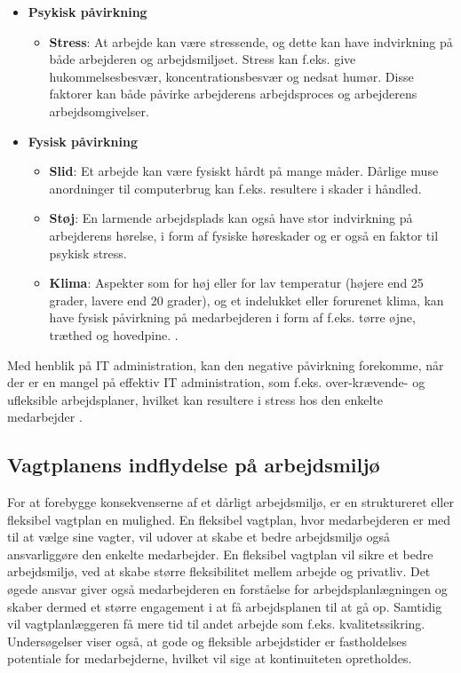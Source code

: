 \begin{itemize}
    \item {\textbf{Psykisk påvirkning} \citep{Arbejdsmiljoe_psykisk}}
    \begin{itemize}
    \item {\textbf{Stress}: At arbejde kan være stressende, og dette kan have indvirkning på både arbejderen og arbejdsmiljøet. Stress kan f.eks. give hukommelsesbesvær, koncentrationsbesvær og nedsat humør. Disse faktorer kan både påvirke arbejderens arbejdsproces og arbejderens arbejdsomgivelser. \citep{Arbejdsmiljoe_stress}}\\
    \end{itemize}
    \item {\textbf{Fysisk påvirkning} \citep{Arbejdsmiljoe_fysisk}}
    \begin{itemize}
    \item {\textbf{Slid}: Et arbejde kan være fysiskt hårdt på mange måder. Dårlige muse anordninger til computerbrug kan f.eks. resultere i skader i håndled. \citep{Arbejdsmiljoe_fysisk}}
    \item {\textbf{Støj}: En larmende arbejdsplads kan også have stor indvirkning på arbejderens hørelse, i form af fysiske høreskader og er også en faktor til psykisk stress. \citep{Arbejdsmiljoe_stoej}}
    \item {\textbf{Klima}: Aspekter som for høj eller for lav temperatur (højere end 25 grader, lavere end 20 grader), og et indelukket eller forurenet klima, kan have fysisk påvirkning på medarbejderen i form af f.eks. tørre øjne, træthed og hovedpine. \citep{Arbejdsmiljoe_indeklima}.}\\
    \end{itemize}
\end{itemize}

Med henblik på IT administration, kan den negative påvirkning forekomme, når der er en mangel på effektiv IT administration, som f.eks. over-krævende- og ufleksible arbejdsplaner, hvilket kan resultere i stress hos den enkelte medarbejder \citep{Cambridge2011}.

\subsection{Vagtplanens indflydelse på arbejdsmiljø}
For at forebygge konsekvenserne af et dårligt arbejdsmiljø, er en struktureret eller fleksibel vagtplan en mulighed. En fleksibel vagtplan, hvor medarbejderen er med til at vælge sine vagter, vil udover at skabe et bedre arbejdsmiljø også ansvarliggøre den enkelte medarbejder. En fleksibel vagtplan vil sikre et bedre arbejdsmiljø, ved at skabe større fleksibilitet mellem arbejde og privatliv. Det øgede ansvar giver også medarbejderen en forståelse for arbejdsplanlægningen og skaber dermed et større engagement i at få arbejdsplanen til at gå op. Samtidig vil vagtplanlæggeren få mere tid til andet arbejde som f.eks. kvalitetssikring.
Undersøgelser viser også, at gode og fleksible arbejdstider er fastholdelses potentiale for medarbejderne, hvilket vil sige at kontinuiteten opretholdes. \citep{It_armil} 


